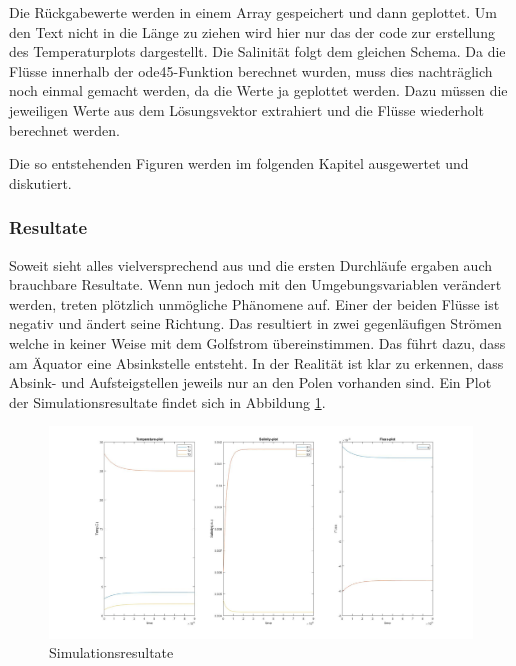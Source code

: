 \label{thermohalin:listing:solve}

Die Rückgabewerte werden in einem Array gespeichert und dann geplottet. Um den Text nicht in die Länge zu ziehen wird hier nur das der code zur erstellung des Temperaturplots dargestellt. Die Salinität folgt dem gleichen Schema.
Da die Flüsse innerhalb der ode45-Funktion berechnet wurden, muss dies nachträglich noch einmal gemacht werden, da die Werte ja geplottet werden. Dazu müssen die jeweiligen Werte aus dem Lösungsvektor extrahiert und die Flüsse wiederholt berechnet werden.
\label{thermohalin:listing:plot}

Die so entstehenden Figuren werden im folgenden Kapitel ausgewertet und diskutiert. 

\subsubsection{Resultate}


Soweit sieht alles vielversprechend aus und die ersten Durchläufe ergaben auch brauchbare Resultate. Wenn nun jedoch mit den Umgebungsvariablen verändert werden, treten plötzlich unmögliche Phänomene auf.
Einer der beiden Flüsse ist negativ und ändert seine Richtung. Das resultiert in zwei gegenläufigen Strömen welche in keiner Weise mit dem Golfstrom übereinstimmen. Das führt dazu, dass am Äquator eine Absinkstelle entsteht. In der Realität ist klar zu erkennen, dass Absink- und Aufsteigstellen jeweils nur an den Polen vorhanden sind. 
Ein Plot der Simulationsresultate findet sich in Abbildung \ref{thermohalin:simulationsresultate}.

\begin{figure}
	\includegraphics[width=14cm]{thermohalin/Code/graphs/result-3b2f-script.jpg}
	\centering
	\caption{Simulationsresultate}
	\label{thermohalin:simulationsresultate}
\end{figure}

